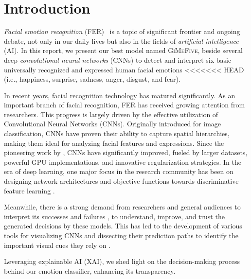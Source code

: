 \section{Introduction}
\label{sec:intro}

\textit{Facial emotion recognition} (FER)~\cite{Ko18,JainSS19,YinTLS019,Malik0R21} is a topic of significant frontier and ongoing debate, 
not only in our daily lives but also in the fields of \textit{artificial intelligence} (AI).
In this report, we present our best model named \textsc{GiMeFive}, 
beside several deep \textit{convolutional neural networks} (CNNs) 
to detect and interpret six basic universally recognized and expressed human facial emotions 
<<<<<<< HEAD
(i.e., happiness, surprise, sadness, anger, disgust, and fear).

In recent years, facial recognition technology has matured significantly. 
As an important branch of facial recognition, FER has received growing attention from researchers. 
This progress is largely driven by the effective utilization of Convolutional Neural Networks (CNNs). 
Originally introduced for image classification, CNNs have proven their ability to capture spatial hierarchies, 
making them ideal for analyzing facial features and expressions. 
Since the pioneering work by \citet{Lecun89Backpropagation}, 
CNNs have significantly improved, fueled by larger datasets, 
powerful GPU implementations, and innovative regularization strategies.
In the era of deep learning, one major focus in the research community has been on designing network architectures and objective 
functions towards discriminative feature learning \cite{HeZRS16, liu2017learning, wen2016discriminative}.

Meanwhile, there is a strong demand from researchers and general audiences to interpret its successes and 
failures \cite{goodfellow2014explaining}, to understand, improve, and trust the generated decisions by these models. 
This has led to the development of various tools for visualizing CNNs and dissecting their prediction paths to identify the 
important visual cues they rely on \cite{olah2018building}.

Leveraging explainable AI (XAI), 
we shed light on the decision-making process behind our emotion classifier, 
enhancing its transparency. 

